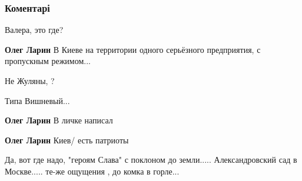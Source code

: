  
 
 
 
 
\subsubsection{Коментарі}
\label{sec:20_10_2021.fb.jermolajev_valerij.1.molodcy_patrioty.cmt}

\begin{itemize} %
Валера, это где?

\textbf{Олег Ларин} В Киеве на территории одного серьёзного предприятия, с пропускным режимом...

Не Жуляны, ?

Типа Вишневый...

\textbf{Олег Ларин} В личке написал

\textbf{Олег Ларин} Киев/ есть патриоты

Да, вот где надо, "героям Слава" с поклоном до земли..... Александровский сад в Москве..... те-же ощущения , до комка в горле...
\end{itemize} %
